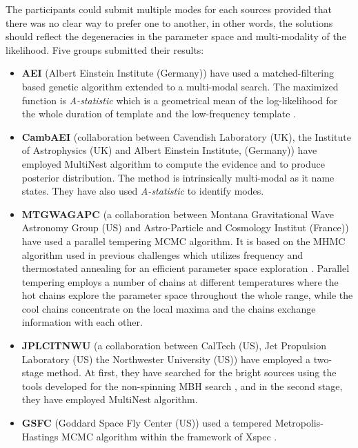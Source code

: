 \documentclass{iopart}
\begin{document}
The participants could submit multiple modes for each sources provided that there was no clear way to prefer one to another, in other words, the solutions should reflect the degeneracies in the parameter space and multi-modality of the
likelihood. Five groups submitted their results: 
\begin{itemize}
\item \textbf{AEI} (Albert Einstein Institute (Germany))  have used a matched-filtering based genetic algorithm extended to a multi-modal search. The maximized function is {\em A-statistic} which is a geometrical mean of the log-likelihood for the whole duration of template and the low-frequency template \cite{GAspinbbhFullPaper}.

\item \textbf{CambAEI} (collaboration between Cavendish Laboratory (UK), the Institute of Astrophysics (UK) and Albert Einstein Institute, (Germany)) have employed MultiNest algorithm \cite{MultiNest2} to compute the 
evidence and to produce posterior distribution. The method is intrinsically multi-modal as it name states. They have 
also used {\em A-statistic} to identify modes.

\item \textbf{MTGWAGAPC} (a collaboration between Montana Gravitational Wave Astronomy Group (US) and  
Astro-Particle and Cosmology Institut (France)) have used a parallel tempering MCMC algorithm. It is based on the MHMC algorithm used in previous challenges which utilizes frequency and thermostated annealing for an efficient parameter space exploration \cite{SMBHCornishPorter}. Parallel tempering employs a number of chains
 at different temperatures where the hot chains explore the parameter space throughout the whole range, while the cool chains concentrate on the local maxima and the chains exchange information with each other.

\item \textbf{JPLCITNWU} (a collaboration between  CalTech (US),  Jet Propulsion Laboratory (US)  
the Northwester University (US)) have employed a two-stage method. At first, they have searched for the bright sources using the tools developed for the non-spinning MBH search \cite{JPLCaltech}, and in the second stage, they have employed  MultiNest algorithm.

\item \textbf{GSFC} (Goddard Space Fly Center (US)) used a tempered Metropolis-Hastings MCMC algorithm within the framework of Xspec \cite{Xspec}. 

\end{itemize}
\end{document}
